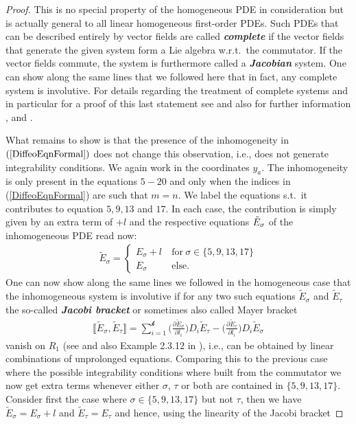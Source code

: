 \begin{proof}
This is no special property of the homogeneous PDE in consideration but is actually general to all linear homogeneous first-order PDEs. Such PDEs that can be described entirely by vector fields are called \textit{\textbf{complete}} if the vector fields that generate the given system form a Lie algebra w.r.t.\ the commutator. If the vector fields commute, the system is furthermore called a \textit{\textbf{Jacobian}} system. One can show along the same lines that we followed here that in fact, any complete system is involutive. For details regarding the treatment of complete systems and in particular for a proof of this last statement see \cite{seiler1994analysis} and also for further information \cite{Clebsch1866}, \cite{caratheodory1956variationsrechnung} and \cite{lie1970theorie}.

What remains to show is that the presence of the inhomogeneity in $(\ref{DiffeoEqnFormal})$ does not change this observation, i.e., does not generate integrability conditions. We again work in the coordinates $y_a$. The inhomogeneity is only present in the equations $5-20$ and only when the indices in (\ref{DiffeoEqnFormal}) are such that $m = n$. We label the equations s.t.\ it contributes to equation $5,9,13$ and $17$. In each case, the contribution is simply given by an extra term of $+l$ and the respective equations $\Tilde{E}_{\sigma}$ of the inhomogeneous PDE read now: 
\begin{align}
     \tilde{E}_{\sigma} = \begin{cases}
     E_{\sigma} + l \ &\text{for} \ \sigma \in \{ 5,9,13,17 \}\\
     E_{\sigma} \ &\text{else}.
     \end{cases}
\end{align}
One can now show along the same lines we followed in the homogeneous case that the inhomogeneous system is involutive if for any two such equations $\tilde{E}_{\sigma}$ and $\tilde{E}_{\tau}$ the so-called \textit{\textbf{Jacobi bracket}} or sometimes also called Mayer bracket
\begin{align}
  \llbracket \tilde{E}_{\sigma}, \tilde{E}_{\tau} \rrbracket = \sum _{i = 1}^{\mathcal{k}} \biggl(\frac{\partial \tilde{E}_{\sigma}}{\partial l_i}\biggr) D_{i}\tilde{E}_{\tau} -  \biggl(\frac{\partial \tilde{E}_{\tau}}{\partial l_i}\biggr) D_{i}\tilde{E}_{\sigma} 
\end{align}
vanish on $R_1$ (see  \cite{seiler1994analysis} and also Example 2.3.12 in \cite{seiler2009involution}), i.e., can be obtained by linear combinations of unprolonged equations. Comparing this to the previous case where the possible integrability conditions where built from the commutator we now get extra terms whenever either $\sigma$, $\tau$ or both are contained in $\{ 5,9,13,17 \}$. Consider first the case where $\sigma \in \{5,9,13,17\}$ but not $\tau$, then we have $\tilde{E}_{\sigma} = E_{\sigma} + l$ and $\tilde{E}_{\tau} = E_{\tau}$ and hence, using the linearity of the Jacobi bracket

\end{proof}
